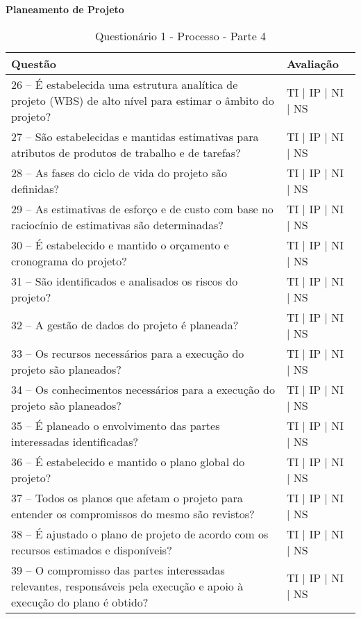 \documentclass[openany,10pt,a4paper]{article}
\begin{document}
\begin{longtable}
\begin{appendix}
\begin{table}[h]
\textbf{Planeamento de Projeto}
	\centering
	\caption{Questionário 1 - Processo - Parte 4}
	\begin{tabular}{p{3.5in}p{2in}}		
		\toprule
		\textbf{Questão}  & \textbf{Avaliação}\\ 
		\midrule
		26 – É estabelecida uma estrutura analítica de projeto (WBS) de alto nível para estimar o âmbito 
do projeto?
 & TI | IP | NI | NS \\
        \midrule
		27 – São estabelecidas e mantidas estimativas para atributos de produtos de trabalho e de 
tarefas?
 & TI | IP | NI | NS \\
		\midrule
        28 – As fases do ciclo de vida do projeto são definidas?
 & TI | IP | NI | NS \\
		\midrule
        29 – As estimativas de esforço e de custo com base no raciocínio de estimativas são 
determinadas?
 & TI | IP | NI | NS \\
		\midrule
		30 – É estabelecido e mantido o orçamento e cronograma do projeto?
  & TI | IP | NI | NS \\
		\midrule
		31 – São identificados e analisados os riscos do projeto?
 & TI | IP | NI | NS \\
		\midrule
		32 – A gestão de dados do projeto é planeada?
 & TI | IP | NI | NS \\
        \midrule
        33 – Os recursos necessários para a execução do projeto são planeados?
 & TI | IP | NI | NS \\
        \midrule
         34 – Os conhecimentos necessários para a execução do projeto são planeados?
         & TI | IP | NI | NS \\
         \midrule
         35 – É planeado o envolvimento das partes interessadas identificadas?
         & TI | IP | NI | NS \\
         \midrule
         36 – É estabelecido e mantido o plano global do projeto?
         & TI | IP | NI | NS \\
         \midrule
         37 – Todos os planos que afetam o projeto para entender os compromissos do mesmo são 
revistos?
         & TI | IP | NI | NS \\
         \midrule
         38 – É ajustado o plano de projeto de acordo com os recursos estimados e disponíveis?
         & TI | IP | NI | NS \\
         \midrule
        39 – O compromisso das partes interessadas relevantes, responsáveis pela execução e apoio à 
execução do plano é obtido?
         & TI | IP | NI | NS \\
		\bottomrule
	\end{tabular} 
	\label{tab:tabela1}
\end{table}


\end{appendix}
\end{longtable}
\end{document}
